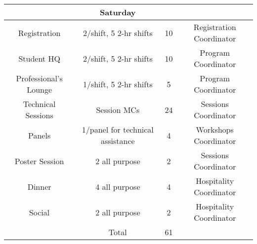 \begin{table}[H]
\begin{tabular}{ccc|c}
	\hline
	& \textbf{Saturday} & &\\
	\hline
	Registration & 2/shift, 5 2-hr shifts & 10& Registration Coordinator\\
	Student HQ & 2/shift, 5 2-hr shifts & 10& Program Coordinator\\
	Professional's Lounge & 1/shift, 5 2-hr shifts & 5& Program Coordinator\\
	Technical Sessions & Session MCs & 24& Sessions Coordinator\\
	Panels & 1/panel for technical assistance & 4& Workshops Coordinator\\
 	Poster Session & 2 all purpose & 2& Sessions Coordinator\\
	Dinner & 4 all purpose & 4& Hospitality Coordinator\\
	Social & 2 all purpose & 2& Hospitality Coordinator\\
	\hline
	 & Total & 61&\\
	\hline
	\end{tabular}
\end{table}